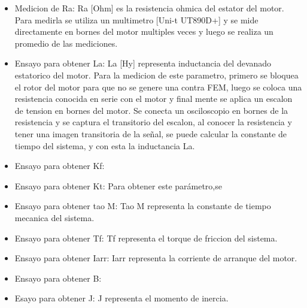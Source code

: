 \documentclass[a4paper]{article}
\begin{document}
    \begin{itemize}
        \item Medicion de Ra:
        Ra [Ohm] es la resistencia ohmica del estator del motor. Para medirla se utiliza un multimetro [Uni-t UT890D+] y se mide directamente en bornes del motor multiples veces y luego se realiza un promedio de las mediciones.

        \item Ensayo para obtener La:
        La [Hy] representa inductancia del devanado estatorico del motor. Para la medicion de este parametro, primero se bloquea el rotor del motor para que no se genere una contra FEM, luego se coloca una resistencia conocida en serie con el motor y final mente se aplica un escalon de tension en bornes del motor. Se conecta un osciloscopio en bornes de la resistencia y se captura el transitorio del escalon, al conocer la resistencia y tener una imagen transitoria de la señal, se puede calcular la constante de tiempo del sistema, y con esta la inductancia La.

        \item Ensayo para obtener Kf:
        
        \item Ensayo para obtener Kt:
        Para obtener este parámetro,se
        
        \item Ensayo para obtener tao M:
        Tao M representa la constante de tiempo mecanica del sistema.
        
        \item Ensayo para obtener Tf:
        Tf representa el torque de friccion del sistema.
        
        \item Ensayo para obtener Iarr:
        Iarr representa la corriente de arranque del motor.
        
        \item Ensayo para obtener B:
        
        \item Esayo para obtener J: 
        J representa el momento de inercia.
        
        
    \end{itemize}
\end{document}
